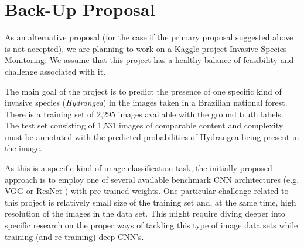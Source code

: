 \documentclass[10pt,twocolumn,letterpaper]{article}
\begin{document}
\section{Back-Up Proposal}
As an alternative proposal (for the case if the primary proposal suggested above is not accepted), we are planning to work on a Kaggle project \href{https://www.kaggle.com/c/invasive-species-monitoring/data}{Invasive Species Monitoring}. We assume that this project has a healthy balance of feasibility and challenge associated with it.\par
The main goal of the project is to predict the presence of one specific kind of invasive species (\textit{Hydrangea}) in the images taken in a Brazilian national forest. There is a training set of 2,295 images available with the ground truth labels. The test set consisting of 1,531 images of comparable content and complexity must be annotated with the predicted probabilities of Hydrangea being present in the image.\par
As this is a specific kind of image classification task, the initially proposed approach is to employ one of several available benchmark CNN architectures (e.g. VGG \cite{vgg} or ResNet \cite{resnet}) with pre-trained weights. One particular challenge related to this project is relatively small size of the training set and, at the same time, high resolution of the images in the data set. This might require diving deeper into specific research on the proper ways of tackling this type of image data sets while training (and re-training) deep CNN's.
\end{document}

